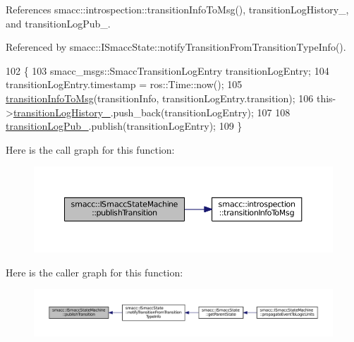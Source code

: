 References smacc\+::introspection\+::transition\+Info\+To\+Msg(), transition\+Log\+History\+\_\+, and transition\+Log\+Pub\+\_\+.



Referenced by smacc\+::\+I\+Smacc\+State\+::notify\+Transition\+From\+Transition\+Type\+Info().


\begin{DoxyCode}
102 \{
103     smacc\_msgs::SmaccTransitionLogEntry transitionLogEntry;
104     transitionLogEntry.timestamp = ros::Time::now();
105     \hyperlink{namespacesmacc_1_1introspection_a6c1b51c4d44fd5e41fe218f1ee150681}{transitionInfoToMsg}(transitionInfo, transitionLogEntry.transition);
106     this->\hyperlink{classsmacc_1_1ISmaccStateMachine_af682d5fce5bb7c959e2b8814dae50023}{transitionLogHistory\_}.push\_back(transitionLogEntry);
107 
108     \hyperlink{classsmacc_1_1ISmaccStateMachine_acc42eb050325c1edc77d81675fb1286a}{transitionLogPub\_}.publish(transitionLogEntry);
109 \}
\end{DoxyCode}


Here is the call graph for this function\+:
\nopagebreak
\begin{figure}[H]
\begin{center}
\leavevmode
\includegraphics[width=350pt]{classsmacc_1_1ISmaccStateMachine_ab61bff5b3c49c4bfc17972e2de8d4fd5_cgraph}
\end{center}
\end{figure}




Here is the caller graph for this function\+:
\nopagebreak
\begin{figure}[H]
\begin{center}
\leavevmode
\includegraphics[width=350pt]{classsmacc_1_1ISmaccStateMachine_ab61bff5b3c49c4bfc17972e2de8d4fd5_icgraph}
\end{center}
\end{figure}


